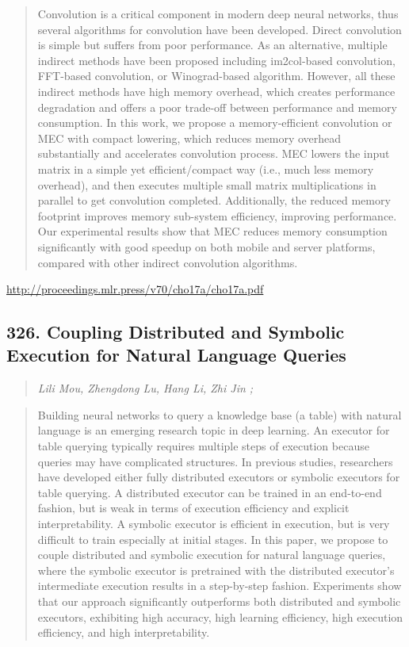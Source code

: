 \documentclass{article}
\begin{document}
\begin{quote}
    Convolution is a critical component in modern deep neural networks, thus several algorithms for convolution have been developed. Direct convolution is simple but suffers from poor performance. As an alternative, multiple indirect methods have been proposed including im2col-based convolution, FFT-based convolution, or Winograd-based algorithm. However, all these indirect methods have high memory overhead, which creates performance degradation and offers a poor trade-off between performance and memory consumption. In this work, we propose a memory-efficient convolution or MEC with compact lowering, which reduces memory overhead substantially and accelerates convolution process. MEC lowers the input matrix in a simple yet efficient/compact way (i.e., much less memory overhead), and then executes multiple small matrix multiplications in parallel to get convolution completed. Additionally, the reduced memory footprint improves memory sub-system efficiency, improving performance. Our experimental results show that MEC reduces memory consumption significantly with good speedup on both mobile and server platforms, compared with other indirect convolution algorithms.  
\end{quote}

\href{http://proceedings.mlr.press/v70/cho17a/cho17a.pdf}{http://proceedings.mlr.press/v70/cho17a/cho17a.pdf}

\subsection{326. Coupling Distributed and Symbolic Execution for Natural Language Queries}

\begin{quote}
\footnotesize{\textit{Lili Mou, Zhengdong Lu, Hang Li, Zhi Jin ;}}

\end{quote}

\begin{quote}
    Building neural networks to query a knowledge base (a table) with natural language is an emerging research topic in deep learning. An executor for table querying typically requires multiple steps of execution because queries may have complicated structures. In previous studies, researchers have developed either fully distributed executors or symbolic executors for table querying. A distributed executor can be trained in an end-to-end fashion, but is weak in terms of execution efficiency and explicit interpretability. A symbolic executor is efficient in execution, but is very difficult to train especially at initial stages. In this paper, we propose to couple distributed and symbolic execution for natural language queries, where the symbolic executor is pretrained with the distributed executor’s intermediate execution results in a step-by-step fashion. Experiments show that our approach significantly outperforms both distributed and symbolic executors, exhibiting high accuracy, high learning efficiency, high execution efficiency, and high interpretability.  
\end{quote}
\end{document}
